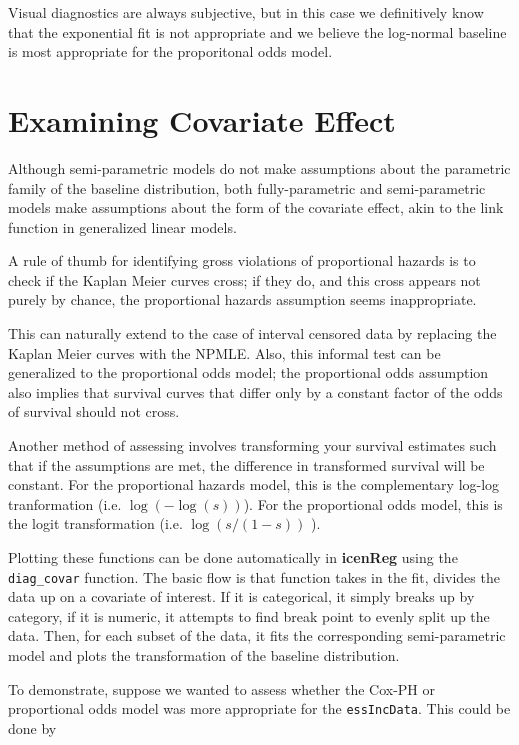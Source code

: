 \documentclass[11pt]{report}
\begin{document}
  Visual diagnostics are always subjective, but in this case we 
  definitively know that the exponential fit is not appropriate 
  and we believe the log-normal baseline is most appropriate 
  for the proporitonal odds model. 
  \section{Examining Covariate Effect}
  
  Although semi-parametric models do not make assumptions about the 
  parametric family of the baseline distribution, both fully-parametric 
  and semi-parametric models make assumptions about the form of the 
  covariate effect, akin to the link function in generalized linear
  models. 
  
  A rule of thumb for identifying gross violations of proportional
  hazards is to check if the Kaplan Meier curves cross; if they do,
  and this cross appears not purely by chance, the proportional 
  hazards assumption seems inappropriate. 
  
  This can naturally extend to the case of interval censored data 
  by replacing the Kaplan Meier curves with the NPMLE. Also, this
  informal test can be generalized to the proportional odds model;
  the proportional odds assumption also implies that survival curves
  that differ only by a constant factor of the odds of survival 
  should not cross. 
  
  Another method of assessing involves transforming your 
  survival estimates such that if the assumptions are met,
  the difference in transformed survival will be constant. 
  For the proportional hazards model, this is the complementary 
  log-log tranformation (i.e. $\log (-\log(s) )$). For the 
  proportional odds model, this is the logit transformation
  (i.e. $\log(s/(1-s))$ ).
  
  Plotting these functions can be done automatically in 
 {\bf icenReg} using the \texttt{diag\_covar} function. The
 basic flow is that function takes in the fit, divides the data
 up on a covariate of interest. If it is categorical, it simply
 breaks up by category, if it is numeric, it attempts to find
 break point to evenly split up the data. Then, for each subset of 
 the data, it fits the corresponding semi-parametric model and
 plots the transformation of the baseline distribution. 
 
 To demonstrate, suppose we wanted to assess whether the Cox-PH
 or proportional odds model was more appropriate for the 
 \texttt{essIncData}. This could be done by 
 
\end{document}
